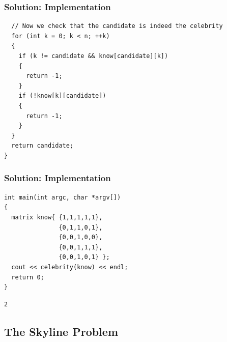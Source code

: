 \documentclass{beamer}
\begin{document}
\begin{frame}[containsverbatim]
\frametitle{Solution: Implementation}

\scriptsize
\begin{lstlisting}
  // Now we check that the candidate is indeed the celebrity
  for (int k = 0; k < n; ++k)
  {
    if (k != candidate && know[candidate][k])
    {
      return -1;
    }
    if (!know[k][candidate])
    {
      return -1;
    }
  }
  return candidate;
}
\end{lstlisting}

\end{frame}

\begin{frame}[containsverbatim]
\frametitle{Solution: Implementation}

\scriptsize
\begin{lstlisting}
int main(int argc, char *argv[])
{
  matrix know{ {1,1,1,1,1},
               {0,1,1,0,1},
               {0,0,1,0,0},
               {0,0,1,1,1},
               {0,0,1,0,1} };
  cout << celebrity(know) << endl;
  return 0;
}
\end{lstlisting}

\begin{verbatim}
2
\end{verbatim}

\end{frame}

\fi

\subsection{The Skyline Problem}

\end{document}

